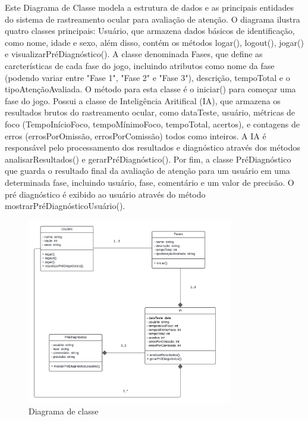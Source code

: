 \documentclass[
  a4paper,%
  12pt,%
  english,%
  brazilian,%
]{article}
\begin{document}
    Este Diagrama de Classe modela a estrutura de dados e as principais entidades do sistema de rastreamento ocular para avaliação de atenção.
    O diagrama ilustra quatro classes principais: Usuário, que armazena dados básicos de identificação, como nome, idade e sexo, além disso, contém os métodos logar(), logout(), jogar() e visualizarPréDiagnóstico(). A classe denominada Fases, que define as carcterísticas de cada fase do jogo, incluindo atributos como nome da fase (podendo variar entre "Fase 1", "Fase 2" e "Fase 3"), descrição, tempoTotal e o tipoAtençãoAvaliada. O método para esta classe é o iniciar() para começar uma fase do jogo. Possui a classe de Inteligência Aritifical (IA), que armazena os resultados brutos do rastreamento ocular, como dataTeste, usuário, métricas de foco (TempoInícioFoco, tempoMínimoFoco, tempoTotal, acertos), e contagens de erros (errosPorOmissão, errosPorComissão) todos como inteiros. A IA é responsável pelo processamento dos resultados e diagnóstico através dos métodos analisarResultados() e gerarPréDiagnóstico(). Por fim, a classe PréDiagnóstico que guarda o resultado final da avaliação de atenção para um usuário em uma determinada fase, incluindo usuário, fase, comentário e um valor de precisão. O pré diagnóstico é exibido ao usuário através do método mostrarPréDiagnósticoUsuário().

    \begin{figure}[H]
\centering
\caption{Diagrama de classe}%
\label{fig:diagrama-de-classe}
\includegraphics[width=0.8\textwidth]{Logos/diagrama-de-classe.png}
\end{figure}
\end{document}
